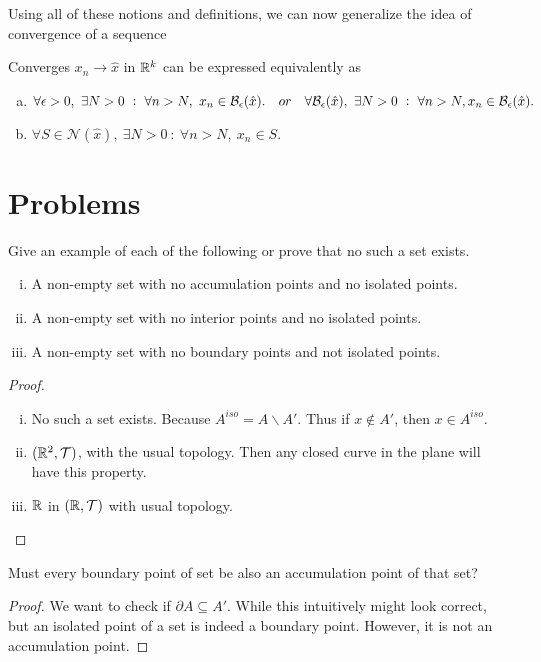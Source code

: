 Using all of these notions and definitions, we can now generalize the idea of convergence of a sequence
\begin{proposition}
	Converges $x_n \to \hat{x}$ in $\mathbb{R}^k$ can be expressed equivalently as 
	\begin{enumerate}[(a)]
		\item $\forall \epsilon>0,\ \exists N>0\ :\ \forall n>N,\ x_n \in \mathcal{B}_{\epsilon}(\hat{x}). \quad or \quad \forall \mathcal{B}_{\epsilon}(\hat{x}),\ \exists N>0\ :\ \forall n>N, x_n \in \mathcal{B}_{\epsilon}(\hat{x}). $
		\item $\forall S \in \mathcal{N}(\hat{x}),\ \exists N>0\ :\ \forall n>N,\ x_n \in S.$
	\end{enumerate}
\end{proposition}


\section{Problems}

\begin{problem}
	Give an example of each of the following or prove that no such a set exists.
	\begin{enumerate}[(i)]
		\item A non-empty set with no accumulation points and no isolated points.
		\item A non-empty set with no interior points and no isolated points.
		\item A non-empty set with no boundary points and not isolated points.
	\end{enumerate}
\end{problem}
\begin{proof}
	~\vspace{2pt}
	\begin{enumerate}[(i)]
		\item No such a set exists. Because $A^{iso} = A \backslash A'$. Thus if $x\notin A'$, then $x \in A^{iso}$.
		\item $(\mathbb{R}^2,\mathcal{T})$, with the usual topology. Then any closed curve in the plane will have this property.
		\item $\mathbb{R}$ in $(\mathbb{R},\mathcal{T})$ with usual topology.
	\end{enumerate}
\end{proof}


\begin{problem}
	Must every boundary point of set be also an accumulation point of that set?
\end{problem}
\begin{proof}
	We want to check if $\partial A \subseteq A'$. While this intuitively might look correct, but an isolated point of a set is indeed a boundary point. However, it is not an accumulation point. 
\end{proof}
